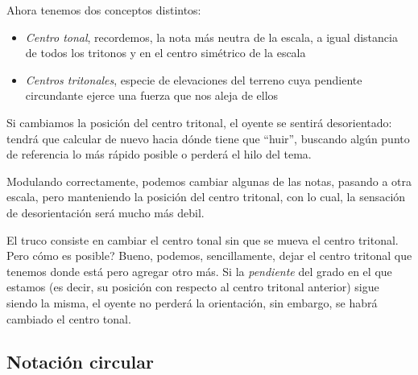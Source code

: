 \documentclass[]{article}
\providecommand{\tightlist}{%
  \setlength{
\itemsep}{0pt}\setlength{\parskip}{0pt}}
\begin{document}
Ahora tenemos dos conceptos distintos:
\begin{itemize}   \tightlist
  \item \emph{Centro tonal}, recordemos, la nota más neutra de la escala, a igual distancia de todos los tritonos y en el centro simétrico de la escala
  \item \emph{Centros tritonales}, especie de elevaciones del terreno cuya pendiente circundante ejerce una fuerza que nos aleja de ellos
\end{itemize}
 

Si cambiamos la posición del centro tritonal, el oyente se sentirá desorientado: tendrá que calcular de nuevo hacia dónde tiene que ``huir'', buscando algún punto de referencia lo más rápido posible o perderá el hilo del tema.

Modulando correctamente, podemos cambiar algunas de las notas, pasando a otra escala, pero manteniendo la posición del centro tritonal, con lo cual, la sensación de desorientación será mucho más debil.

El truco consiste en cambiar el centro tonal sin que se mueva el centro tritonal. Pero cómo es posible? Bueno, podemos, sencillamente, dejar el centro tritonal que tenemos donde está pero agregar otro más. Si la \emph{pendiente} del grado en el que estamos (es decir, su posición con respecto al centro tritonal anterior) sigue siendo la misma, el oyente no perderá la orientación, sin embargo, se habrá cambiado el centro tonal.

\subsection{Notación circular}
\end{document}
